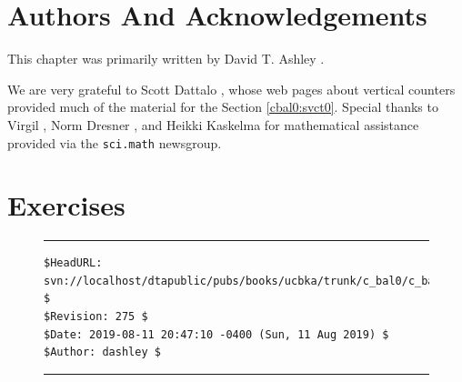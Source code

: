 \section{Authors And Acknowledgements}
This chapter was primarily written by David T. Ashley
\cite{bibref:i:daveashley}.

We are very grateful to Scott Dattalo 
\cite{bibref:i:scottdattalo},
whose web pages about vertical counters provided much of the
material for the Section \ref{cbal0:svct0}.
Special thanks to Virgil \cite{bibref:i:virgil},
Norm Dresner \cite{bibref:i:normdresner},
and Heikki Kaskelma \cite{bibref:i:heikkikaskelma}
for mathematical assistance provided via the 
%
\texttt{sci.math} \cite{bibref:n:scimathnewsgroup} newsgroup.


\section{Exercises}



\noindent\begin{figure}[!b]
\noindent\rule[-0.25in]{\textwidth}{1pt}
\begin{tiny}
\begin{verbatim}
$HeadURL: svn://localhost/dtapublic/pubs/books/ucbka/trunk/c_bal0/c_bal0.tex $
$Revision: 275 $
$Date: 2019-08-11 20:47:10 -0400 (Sun, 11 Aug 2019) $
$Author: dashley $
\end{verbatim}
\end{tiny}
\noindent\rule[0.25in]{\textwidth}{1pt}
\end{figure}

%
